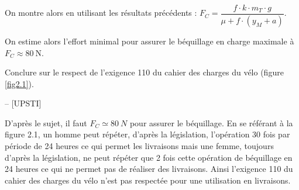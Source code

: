 On montre alors en utilisant les résultats précédents :
$F_{C}=\dfrac{f \cdot k \cdot m_{T} \cdot g}{\mu+f \cdot\left(y_{M}+a\right)}$.

On estime alors l'effort minimal pour assurer le béquillage en charge maximale à \(F_{C} \approx 80 \mathrm{~N}\).

\begin{question}Conclure sur le respect de l'exigence 110 du cahier des charges du vélo (figure \ref{fig2.1}).
\end{question}

\ifprof
\begin{corrige}-- [UPSTI]

D’après le sujet, il faut $F_C \simeq \SI{80}{N}$ pour assurer le béquillage. En se référant à la figure 2.1, un homme peut répéter, d’après la législation, l’opération 30 fois par période de 24 heures ce qui permet les livraisons mais une femme, toujours d’après la législation, ne peut répéter que 2 fois cette opération de béquillage en 24 heures ce qui ne permet pas de réaliser des livraisons. Ainsi l’exigence 110 du cahier des charges du vélo n’est pas respectée pour une utilisation en livraisons.

\end{corrige}
\else
\fi

